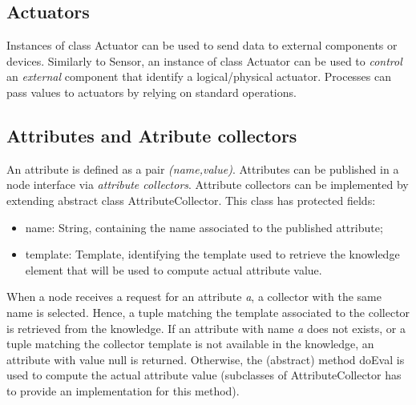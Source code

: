 \documentclass[11pt]{article}
\begin{document}
\subsection{Actuators} 
\label{sec:actuators}

Instances of class \textsf{Actuator} can be used to send data to external components or devices.
Similarly to \textsf{Sensor}, an instance of class \textsf{Actuator} can be used to \emph{control}
an \emph{external} component  that identify a logical/physical actuator. 
%
Processes can pass values to actuators by relying on standard \SCEL{} operations.
%

\subsection{Attributes and Atribute collectors} 
\label{sec:attributes}

An attribute is defined as a pair \emph{(name,value)}. Attributes can be published in a node
interface via \emph{attribute collectors}. 
%
Attribute collectors can be implemented by extending abstract class \textsf{AttributeCollector}.
%
This class has \textsf{protected} fields:
\begin{itemize}
\item \textsf{name: String}, containing the name associated to the published attribute;
\item \textsf{template: Template}, identifying the template used to retrieve the knowledge element
that will be used to compute actual attribute value.
\end{itemize}

When a node receives a request for an attribute \emph{a}, a collector with the same name is
selected. Hence, a tuple matching the template associated to the collector is retrieved from 
the knowledge. If an attribute with name \emph{a} does not exists, or a tuple matching the
collector template is not available in the knowledge, an attribute with value \textsf{null} is returned.
Otherwise, the (abstract) method \textsf{doEval} is used to compute the actual 
attribute value (subclasses of \textsf{AttributeCollector} has to provide an implementation for this method).
\end{document}
